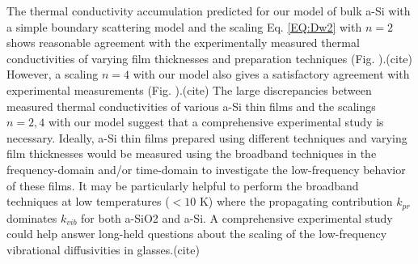 \documentclass[aps,prb,onecolumn,preprint,superscriptaddress,footinbib,amsmath,amssymb,floatfix]{revtex4}
\begin{document}
The thermal conductivity accumulation predicted for our model of bulk 
a-Si with a simple boundary scattering model and the scaling 
Eq. \eqref{EQ:Dw2} with $n=2$ shows reasonable agreement 
with the experimentally measured thermal conductivities 
of varying film thicknesses and preparation techniques (Fig. ).(cite) 
However, a scaling $n=4$ with our model also gives 
a satisfactory agreement with experimental measurements (Fig. ).(cite) 
The large discrepancies between measured 
thermal conductivities of various a-Si thin films and 
the scalings $n=2,4$ with our model suggest that a comprehensive 
experimental study is necessary. Ideally, a-Si thin films  
prepared using different techniques and varying film thicknesses 
would be measured using the broadband techniques in the frequency-domain 
and/or time-domain to investigate the low-frequency behavior of 
these films.\cite{koh_frequency_2007,siemens_quasi-ballistic_2010,
minnich_thermal_2011,regner_broadband_2013}
It may be particularly helpful to perform the broadband techniques at 
low temperatures ($< 10$ K) where the propagating contribution 
$k_{pr}$ dominates $k_{vib}$ for both a-SiO2 and a-Si. 
A comprehensive experimental study could help answer long-held 
questions about the scaling of the low-frequency vibrational 
diffusivities in glasses.(cite) 

\clearpage


\end{document}
